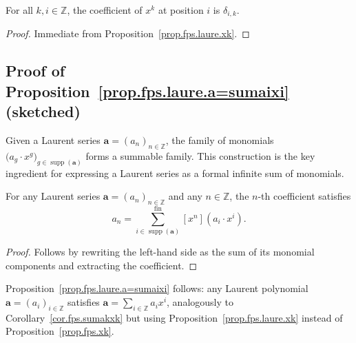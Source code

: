 \begin{lemma}[Coefficient of $x^k$]
\label{lem.fps.laure.xk.coeff}
\leanhelper
\leanok
For all $k, i \in \mathbb{Z}$, the coefficient of $x^k$ at position
$i$ is $\delta_{i,k}$.
\end{lemma}

\begin{proof}
\leanok
Immediate from Proposition~\ref{prop.fps.laure.xk}.
\end{proof}

\subsection{Proof of Proposition~\ref{prop.fps.laure.a=sumaixi} (sketched)}

\begin{definition}
\label{def.fps.laure.singleFamily}
\leanhelper
\leanok
Given a Laurent series $\mathbf{a} = (a_n)_{n \in \mathbb{Z}}$, the family
of monomials $\bigl(a_g \cdot x^g\bigr)_{g \in \operatorname{supp}(\mathbf{a})}$
forms a summable family. This
construction is the key ingredient for expressing a Laurent series
as a formal infinite sum of monomials.
\end{definition}

\begin{lemma}
\label{lem.fps.laure.coeff-finsum-single}
\leanhelper
\leanok
For any Laurent series $\mathbf{a} = (a_n)_{n \in \mathbb{Z}}$ and any
$n \in \mathbb{Z}$, the $n$-th coefficient satisfies
\[
  a_n = \sum_{i \in \operatorname{supp}(\mathbf{a})}^{\mathrm{fin}}
        [x^n](a_i \cdot x^i).
\]
\end{lemma}

\begin{proof}
Follows by rewriting the left-hand side as the sum of its
monomial components and extracting the coefficient.
\end{proof}

Proposition~\ref{prop.fps.laure.a=sumaixi} follows: any Laurent
polynomial $\mathbf{a} = (a_i)_{i \in \mathbb{Z}}$ satisfies
$\mathbf{a} = \sum_{i \in \mathbb{Z}} a_i x^i$, analogously to
Corollary~\ref{cor.fps.sumakxk} but using
Proposition~\ref{prop.fps.laure.xk} instead of
Proposition~\ref{prop.fps.xk}.

